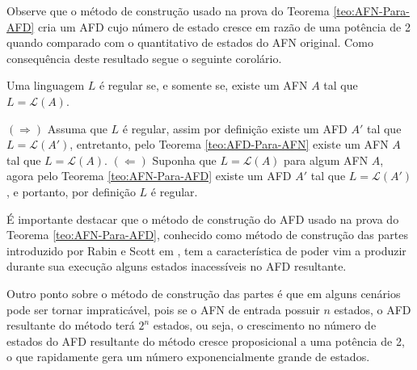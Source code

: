 Observe que o método de construção usado na prova do Teorema \ref{teo:AFN-Para-AFD} cria um AFD cujo número de estado cresce em razão de uma potência de 2 quando comparado com o quantitativo de estados do AFN original. Como consequência deste resultado segue o seguinte corolário.

\begin{corolario}
  Uma linguagem $L$ é regular se, e somente se, existe um AFN $A$ tal que $L = \mathcal{L}(A)$.
\end{corolario}

\begin{prova}
	$(\Rightarrow)$ Assuma que $L$ é regular, assim por definição existe um AFD $A'$ tal que $L = \mathcal{L}(A')$, entretanto, pelo Teorema \ref{teo:AFD-Para-AFN} existe um AFN $A$ tal que $L = \mathcal{L}(A)$. $(\Leftarrow)$ Suponha que $L = \mathcal{L}(A)$ para algum AFN $A$, agora pelo Teorema \ref{teo:AFN-Para-AFD} existe um AFD $A'$ tal que $L = \mathcal{L}(A')$, e portanto, por definição $L$ é regular.
\end{prova}

É importante destacar que o método de construção do AFD usado na prova do Teorema \ref{teo:AFN-Para-AFD}, conhecido como método de construção das partes introduzido por Rabin e Scott em \cite{rabin1959}, tem a característica de poder vim a produzir durante sua execução alguns estados inacessíveis no AFD resultante.

Outro ponto sobre o método de construção das partes é que em alguns cenários pode ser tornar impraticável, pois se o AFN de entrada possuir $n$ estados, o AFD resultante do método terá $2^n$ estados, ou seja, o crescimento no número de estados do AFD resultante do método cresce proposicional a uma potência de 2, o que rapidamente gera um número exponencialmente grande de estados. 


